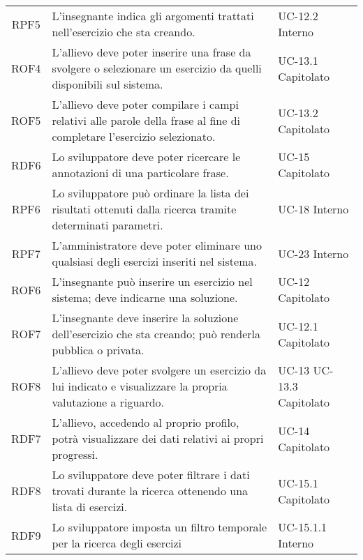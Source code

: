 \begin{tabularx}{\textwidth}{| c | p{10cm} | X |}
		RPF5 & L'insegnante indica gli argomenti trattati nell'esercizio che sta creando. & UC-12.2 \newline Interno\\
		ROF4 & L'allievo deve poter inserire una frase da svolgere o selezionare un esercizio da quelli disponibili sul sistema. & UC-13.1 \newline Capitolato\\
		ROF5 & L'allievo deve poter compilare i campi relativi alle parole della frase al fine di completare l'esercizio selezionato. & UC-13.2 \newline Capitolato\\
		RDF6 & Lo sviluppatore deve poter ricercare le annotazioni di una particolare frase. & UC-15 \newline Capitolato\\
		RPF6 & Lo sviluppatore può ordinare la lista dei risultati ottenuti dalla ricerca tramite determinati parametri. & UC-18 \newline Interno\\
		RPF7 & L'amministratore deve poter eliminare uno qualsiasi degli esercizi inseriti nel sistema. & UC-23 \newline Interno\\
		ROF6 & L'insegnante può inserire un esercizio nel sistema; deve indicarne una soluzione. & UC-12 \newline Capitolato\\
		ROF7 & L'insegnante deve inserire la soluzione dell'esercizio che sta creando; può renderla pubblica o privata. & UC-12.1 \newline Capitolato\\
		ROF8 & L'allievo deve poter svolgere un esercizio da lui indicato e visualizzare la propria valutazione a riguardo. & UC-13 \newline UC-13.3 \newline Capitolato\\
		RDF7 & L'allievo, accedendo al proprio profilo, potrà visualizzare dei dati relativi ai propri progressi. & UC-14 \newline Capitolato\\
		RDF8 & Lo sviluppatore deve poter filtrare i dati trovati durante la ricerca ottenendo una lista di esercizi. & UC-15.1 \newline Capitolato\\
		RDF9 & Lo sviluppatore imposta un filtro temporale per la ricerca degli esercizi & UC-15.1.1 \newline Interno\\

\end{tabularx}
